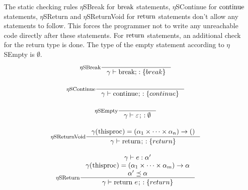 \documentclass[a4paper, 10pt, draft]{report}
\newcommand{\mycode}[1]{\ensuremath{\mbox{\lstinline{#1}}}}
\begin{document}
The static checking rules $\eta$SBreak for \mycode{break} statements,
$\eta$SContinue for \mycode{continue} statements, $\eta$SReturn and
$\eta$SReturnVoid for \mycode{return} statements don't allow any statements to
follow. This forces the programmer not to write any unreachable code directly
after these statements. For \mycode{return} statements, an additional check for
the return type is done. The type of the empty statement according to
$\eta$SEmpty is $\emptyset$.
\[ \begin{array}{c}
\inference[$\eta$SBreak]{}{\gamma |- \mycode{break;} : \left\{ break \right\} } \\[2em]
\inference[$\eta$SContinue]{}{\gamma |- \mycode{continue;} : \left\{ continue\right\} } \\[2em]
\inference[$\eta$SEmpty]{}{\gamma |- \varepsilon\mycode{;} : \emptyset } \\[2em]
\inference[$\eta$SReturnVoid]{
  \gamma(\mycode{thisproc}) = (\alpha_1\times\dots\times\alpha_n)\to()
}{
  \gamma |- \mycode{return;} : \left\{ return \right\}
} \\[2em]
\inference[$\eta$SReturn]{
  \gamma |- e : \alpha' \\
  \gamma(\mycode{thisproc}) = (\alpha_1\times\dots\times\alpha_m)\to\alpha \\
  \alpha' \preceq \alpha \\
}{
  \gamma |- \mycode{return}\ e \mycode{;} : \left\{ return \right\}
}
\end{array}\]
\end{document}
